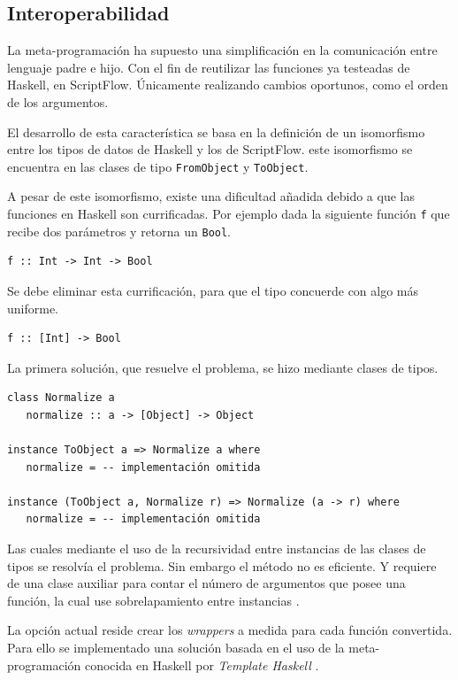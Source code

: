 \documentclass[11pt]{article}
\begin{document}
\subsection{Interoperabilidad}
\label{sec:orgf015add}

La meta-programación ha supuesto una simplificación en la comunicación entre lenguaje padre e hijo. Con el fin de reutilizar las funciones
ya testeadas de Haskell, en ScriptFlow. Únicamente realizando cambios oportunos, como el orden de los argumentos.

El desarrollo de esta característica se basa en la definición de un isomorfismo entre los tipos de datos de Haskell y los de ScriptFlow.
este isomorfismo se encuentra en las clases de tipo \texttt{FromObject} y \texttt{ToObject}.

A pesar de este isomorfismo, existe una dificultad añadida debido a que las funciones en Haskell son currificadas. Por ejemplo dada la siguiente
función \texttt{f} que recibe dos parámetros y retorna un \texttt{Bool}.

\begin{verbatim}
f :: Int -> Int -> Bool
\end{verbatim}

Se debe eliminar esta currificación, para que el tipo concuerde con algo más uniforme.

\begin{verbatim}
f :: [Int] -> Bool
\end{verbatim}

La primera solución, que resuelve el problema, se hizo mediante clases de tipos.
\begin{verbatim}
class Normalize a
   normalize :: a -> [Object] -> Object

instance ToObject a => Normalize a where
   normalize = -- implementación omitida

instance (ToObject a, Normalize r) => Normalize (a -> r) where
   normalize = -- implementación omitida
\end{verbatim}

Las cuales mediante el uso de la recursividad entre instancias de las clases de tipos se resolvía el problema. Sin embargo
el método no es eficiente. Y requiere de una clase auxiliar para contar el número de argumentos que posee una función, la cual use
sobrelapamiento entre instancias \cite{overlaping-instances}.

La opción actual reside crear los \emph{wrappers} a medida para cada función convertida. Para ello se implementado una solución
basada en el uso de la meta-programación conocida en Haskell por \emph{Template Haskell} \cite{template-haskell} .
\end{document}
